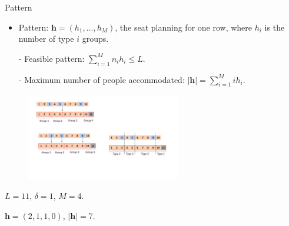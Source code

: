   \begin{frame}{Pattern}
    \begin{itemize}
      \item Pattern: $\bm{h} = (h_1, \ldots, h_M)$, the seat planning for one row, where $h_i$ is the number of type $i$ groups.
      \item [-] Feasible pattern: $\sum_{i=1}^{M} n_i h_i \leq L$.
      \item [-] Maximum number of people accommodated: $|\bm{h}| = \sum_{i =1}^{M} i h_i$.
    \end{itemize}
    
    \begin{figure}[ht]
      \centering
      \includegraphics[width = 0.6\textwidth]{./images/group_delta.pdf}
    \end{figure}
    \centering
    $L = 11$, $\delta =1$, $M =4$.

    $\bm{h} = (2, 1, 1, 0)$, $|\bm{h}| = 7$.
  \end{frame}


